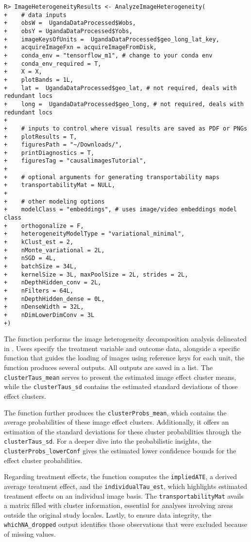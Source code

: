 \documentclass[nojss,shortnames]{jss} %
\begin{document}
\begin{verbatim}
R> ImageHeterogeneityResults <- AnalyzeImageHeterogeneity(
+    # data inputs
+    obsW =  UgandaDataProcessed$Wobs,
+    obsY = UgandaDataProcessed$Yobs,
+    imageKeysOfUnits =  UgandaDataProcessed$geo_long_lat_key,
+    acquireImageFxn = acquireImageFromDisk,
+    conda_env = "tensorflow_m1", # change to your conda env
+    conda_env_required = T,
+    X = X,
+    plotBands = 1L,
+    lat =  UgandaDataProcessed$geo_lat, # not required, deals with redundant locs
+    long =  UgandaDataProcessed$geo_long, # not required, deals with redundant locs
+    
+    # inputs to control where visual results are saved as PDF or PNGs
+    plotResults = T,
+    figuresPath = "~/Downloads/",
+    printDiagnostics = T,
+    figuresTag = "causalimagesTutorial",
+    
+    # optional arguments for generating transportability maps
+    transportabilityMat = NULL,
+    
+    # other modeling options
+    modelClass = "embeddings", # uses image/video embeddings model class
+    orthogonalize = F,
+    heterogeneityModelType = "variational_minimal",
+    kClust_est = 2,
+    nMonte_variational = 2L,
+    nSGD = 4L,
+    batchSize = 34L,
+    kernelSize = 3L, maxPoolSize = 2L, strides = 2L,
+    nDepthHidden_conv = 2L,
+    nFilters = 64L,
+    nDepthHidden_dense = 0L,
+    nDenseWidth = 32L,
+    nDimLowerDimConv = 3L
+)
\end{verbatim}
The function performs the image heterogeneity decomposition analysis delineated in \citet{jejoda2022_hetero}. Users specify the treatment variable and outcome data, alongside a specific function that guides the loading of images using reference keys for each unit, the function produces several outputs. All outputs are saved in a list. The \texttt{clusterTaus\_mean} serves to present the estimated image effect cluster means, while the \texttt{clusterTaus\_sd} contains the estimated standard deviations of those effect clusters. 

The function further produces the \texttt{clusterProbs\_mean}, which contains the average probabilities of these image effect clusters. Additionally, it offers an estimation of the standard deviations for these cluster probabilities through the \texttt{clusterTaus\_sd}. For a deeper dive into the probabilistic insights, the \texttt{clusterProbs\_lowerConf} gives the estimated lower confidence bounds for the effect cluster probabilities. 

Regarding treatment effects, the function computes the \texttt{impliedATE}, a derived average treatment effect, and the \texttt{individualTau\_est}, which highlights estimated treatment effects on an individual image basis. The \texttt{transportabilityMat} avails a matrix filled with cluster information, essential for analyses involving areas outside the original study locales. Lastly, to ensure data integrity, the \texttt{whichNA\_dropped} output identifies those observations that were excluded because of missing values. 
\end{document}
